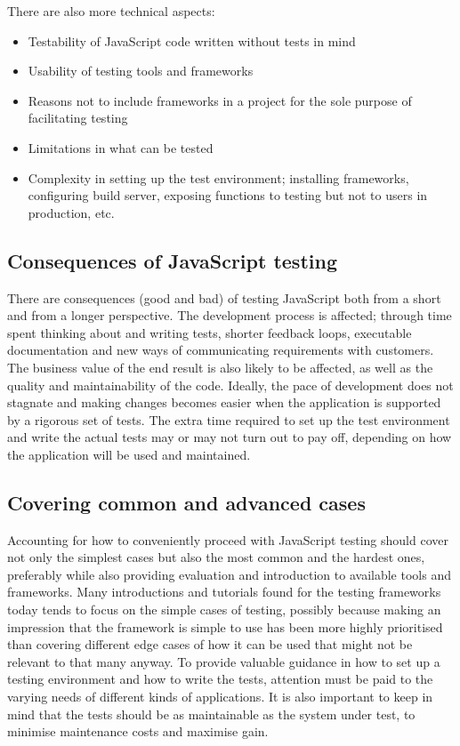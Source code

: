\documentclass[11pt]{article}
\begin{document}
There are also more technical aspects:
\begin{itemize}
\item Testability of JavaScript code written without tests in mind
\item Usability of testing tools and frameworks
\item Reasons not to include frameworks in a project for the sole purpose of facilitating testing
\item Limitations in what can be tested
\item Complexity in setting up the test environment; installing frameworks, configuring build server, exposing functions to testing but not to users in production, etc.
\end{itemize}

\subsection{Consequences of JavaScript testing}

There are consequences (good and bad) of testing JavaScript both from a short and from a longer perspective. The development process is affected; through time spent thinking about and writing tests, shorter feedback loops, executable documentation and new ways of communicating requirements with customers. The business value of the end result is also likely to be affected, as well as the quality and maintainability of the code. Ideally, the pace of development does not stagnate and making changes becomes easier when the application is supported by a rigorous set of tests. The extra time required to set up the test environment and write the actual tests may or may not turn out to pay off, depending on how the application will be used and maintained.

\subsection{Covering common and advanced cases}

Accounting for how to conveniently proceed with JavaScript testing should cover not only the simplest cases but also the most common and the hardest ones, preferably while also providing evaluation and introduction to available tools and frameworks. Many introductions and tutorials found for the testing frameworks today tends to focus on the simple cases of testing, possibly because making an impression that the framework is simple to use has been more highly prioritised than covering different edge cases of how it can be used that might not be relevant to that many anyway. To provide valuable guidance in how to set up a testing environment and how to write the tests, attention must be paid to the varying needs of different kinds of applications. It is also important to keep in mind that the tests should be as maintainable as the system under test, to minimise maintenance costs and maximise gain.
\end{document}
